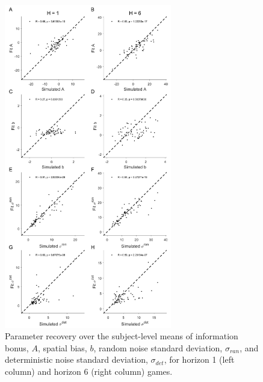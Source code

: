 \documentclass[12pt]{article}
\begin{document}
	\begin{figure}[hp]
		\begin{center}
			\includegraphics[width=0.65\textwidth]{figures/RDBayes_parameterrecovery_subject_examplesession.jpg}
			\caption{Parameter recovery over the subject-level means of information bonus, $A$, spatial bias, $b$, random noise standard deviation, $\sigma_{ran}$, and deterministic noise standard deviation, $\sigma_{det}$, for horizon 1 (left column) and horizon 6 (right column) games.}
			\label{fig:paramrecover_session}
		\end{center}
	\end{figure} 
\end{document}
